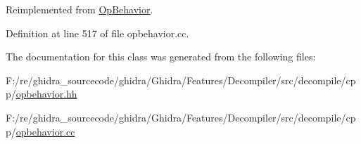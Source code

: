 Reimplemented from \mbox{\hyperlink{class_op_behavior_aeeed3af7aa35264b31a1f182884214a9}{Op\+Behavior}}.



Definition at line 517 of file opbehavior.\+cc.



The documentation for this class was generated from the following files\+:\begin{DoxyCompactItemize}
\item 
F\+:/re/ghidra\+\_\+sourcecode/ghidra/\+Ghidra/\+Features/\+Decompiler/src/decompile/cpp/\mbox{\hyperlink{opbehavior_8hh}{opbehavior.\+hh}}\item 
F\+:/re/ghidra\+\_\+sourcecode/ghidra/\+Ghidra/\+Features/\+Decompiler/src/decompile/cpp/\mbox{\hyperlink{opbehavior_8cc}{opbehavior.\+cc}}\end{DoxyCompactItemize}
